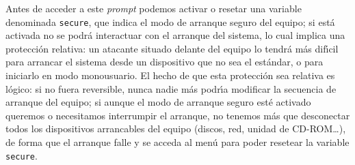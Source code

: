 Antes de acceder a este {\it prompt} podemos activar o resetar una variable 
denominada {\tt secure}, que indica el modo de arranque seguro del equipo; si
est\'a activada no se podr\'a interactuar con el arranque del sistema, lo cual
implica una protecci\'on relativa: un atacante situado delante del equipo lo
tendr\'a m\'as dif\'{\i}cil para arrancar el sistema desde un dispositivo que
no sea el est\'andar, o para iniciarlo en modo monousuario. El hecho de que esta
protecci\'on sea relativa es l\'ogico: si no fuera reversible, nunca nadie m\'as
podr\'{\i}a modificar la secuencia de arranque del equipo; si aunque el modo de 
arranque seguro est\'e activado queremos o necesitamos interrumpir el arranque,
no tenemos m\'as que desconectar todos los dispositivos arrancables del equipo
(discos, red, unidad de CD-ROM\ldots), de forma que el arranque falle y se
acceda al men\'u para poder resetear la variable {\tt secure}.
